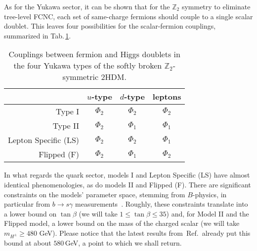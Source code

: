 \documentclass[12pt]{article}
\newcommand{\citere}[1]{Ref.\,\cite{#1}}
\newcommand{\abbrev}{\scalefont{.9}}
\newcommand{\tab}[1]{Tab.\,\ref{#1}}
\newcommand{\thdm}{{\abbrev 2HDM}}
\begin{document}
As for the Yukawa sector, it can be shown that for the $\mathbb{Z}_2$ symmetry to eliminate
tree-level FCNC, each set of same-charge fermions should couple to a single scalar doublet.
This leaves four possibilities for the scalar-fermion couplings, summarized in \tab{tab:types}.
\begin{table}
\begin{center}
\begin{tabular}{rccc} \toprule
& $u$-type & $d$-type & leptons \\ \midrule
Type I & $\Phi_2$ & $\Phi_2$ & $\Phi_2$ \\
Type II & $\Phi_2$ & $\Phi_1$ & $\Phi_1$ \\
Lepton Specific (LS) & $\Phi_2$ & $\Phi_2$ & $\Phi_1$ \\
Flipped (F) & $\Phi_2$ & $\Phi_1$ & $\Phi_2$ \\ \bottomrule
\end{tabular}
\caption{Couplings between fermion and Higgs doublets in the four Yukawa types of the softly
broken $\mathbb{Z}_2$-symmetric \thdm{}. \label{tab:types}}
\end{center}
\end{table}
In what regards the quark sector, models I and Lepton Specific (LS) have almost identical phenomenologies, as do models II and Flipped (F).
There are significant constraints on the models' parameter space, stemming from $B$-physics, in
particular from $b\rightarrow s\gamma$ measurements~\cite{Deschamps:2009rh,Mahmoudi:2009zx,Hermann:2012fc,
Misiak:2015xwa,Misiak:2017bgg}.
Roughly, these constraints translate into a lower bound on $\tan\beta$ (we will take $1 \leq \tan\beta\leq 35$)
and, for Model II and the Flipped model, a lower bound on the mass of the charged scalar (we will take $m_{H^\pm}
\geq 480$ GeV).
Please notice that the latest results from~\citere{Misiak:2017bgg} already put this bound at about
$580$\,GeV, a point to which we shall return.
\end{document}
